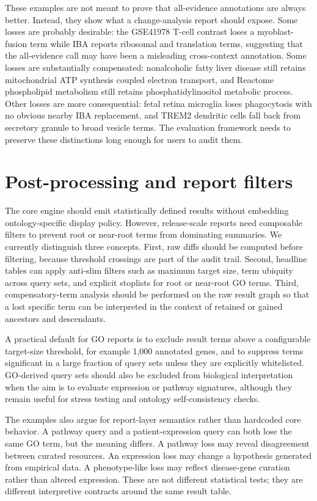 \documentclass[11pt]{article}
\begin{document}
These examples are not meant to prove that all-evidence annotations are always better. Instead, they show what a change-analysis report should expose. Some losses are probably desirable: the GSE41978 T-cell contrast loses a myoblast-fusion term while IBA reports ribosomal and translation terms, suggesting that the all-evidence call may have been a misleading cross-context annotation. Some losses are substantially compensated: nonalcoholic fatty liver disease still retains mitochondrial ATP synthesis coupled electron transport, and Reactome phospholipid metabolism still retains phosphatidylinositol metabolic process. Other losses are more consequential: fetal retina microglia loses phagocytosis with no obvious nearby IBA replacement, and TREM2 dendritic cells fall back from secretory granule to broad vesicle terms. The evaluation framework needs to preserve these distinctions long enough for users to audit them.

\section{Post-processing and report filters}

The core engine should emit statistically defined results without embedding ontology-specific display policy. However, release-scale reports need composable filters to prevent root or near-root terms from dominating summaries. We currently distinguish three concepts. First, raw diffs should be computed before filtering, because threshold crossings are part of the audit trail. Second, headline tables can apply anti-slim filters such as maximum target size, term ubiquity across query sets, and explicit stoplists for root or near-root GO terms. Third, compensatory-term analysis should be performed on the raw result graph so that a lost specific term can be interpreted in the context of retained or gained ancestors and descendants.

A practical default for GO reports is to exclude result terms above a configurable target-size threshold, for example 1,000 annotated genes, and to suppress terms significant in a large fraction of query sets unless they are explicitly whitelisted. GO-derived query sets should also be excluded from biological interpretation when the aim is to evaluate expression or pathway signatures, although they remain useful for stress testing and ontology self-consistency checks.

The examples also argue for report-layer semantics rather than hardcoded core behavior. A pathway query and a patient-expression query can both lose the same GO term, but the meaning differs. A pathway loss may reveal disagreement between curated resources. An expression loss may change a hypothesis generated from empirical data. A phenotype-like loss may reflect disease-gene curation rather than altered expression. These are not different statistical tests; they are different interpretive contracts around the same result table.
\end{document}
